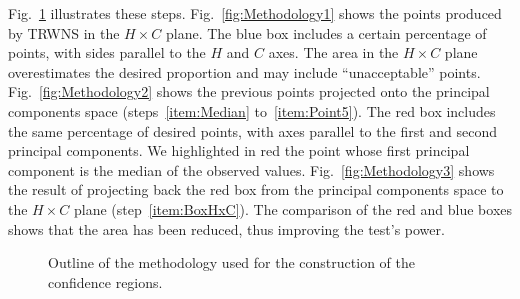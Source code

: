 \documentclass[alpha-refs]{wiley-article}
\begin{document}
Fig.~\ref{fig:methodology} illustrates these steps.
%
Fig.~\ref{fig:Methodology1} shows the points produced by TRWNS in the $H\times C$ plane.
The blue box includes a certain percentage of points, with sides parallel to the $H$ and $C$ axes.
The area in the $H\times C$ plane overestimates the desired proportion and may include ``unacceptable'' points.
%
Fig.~\ref{fig:Methodology2} shows the previous points projected onto the principal components space (steps~\ref{item:Median} to~\ref{item:Point5}).
The red box includes the same percentage of desired points, with axes parallel to the first and second principal components.
We highlighted in red the point whose first principal component is the median of the observed values.
%
Fig.~\ref{fig:Methodology3} shows the result of projecting back the red box from the principal components space to the $H\times C$ plane (step~\ref{item:BoxHxC}).
The comparison of the red and blue boxes shows that the area has been reduced, thus improving the test's power.

\begin{figure}[hbt]
	\centering
	\caption{Outline of the methodology used for the construction of the confidence regions.}
	\label{fig:methodology}
\end{figure}
\end{document}
